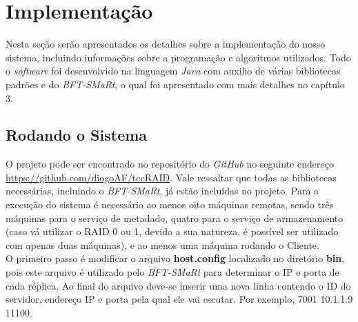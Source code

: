 





\section{Implementação}
Nesta seção serão apresentados os detalhes sobre a implementação do nosso sistema, incluindo informações sobre a programação e algoritmos utilizados. Todo o \textit{software} foi desenvolvido na linguagem \textit{Java} com auxilio de várias bibliotecas padrões e do \textit{BFT-SMaRt}, o qual foi apresentado com mais detalhes no capítulo 3. 
\\

\subsection{Rodando o Sistema}
O projeto pode ser encontrado no repositório do \textit{GitHub} no seguinte endereço \href{https://github.com/diogoAF/tccRAID}{https://github.com/diogoAF/tccRAID}. Vale ressaltar que todas as bibliotecas necessárias, incluindo o  \textit{BFT-SMaRt}, já estão incluídas no projeto. Para a execução do sistema é necessário ao menos oito máquinas remotas, sendo três máquinas para o serviço de metadado, quatro para o serviço de armazenamento (caso vá utilizar o RAID 0 ou 1, devido a sua natureza, é possível ser utilizado com apenas duas máquinas), e ao menos uma máquina rodando o Cliente.
\\

O primeiro passo é modificar o arquivo \textbf{host.config} localizado no diretório \textbf{bin}, pois este arquivo é utilizado pelo \textit{BFT-SMaRt} para determinar o IP e porta de cada réplica. Ao final do arquivo deve-se inserir uma nova linha contendo o ID do servidor, endereço IP e porta pela qual ele vai escutar. Por exemplo, 7001 10.1.1.9 11100.
\\

